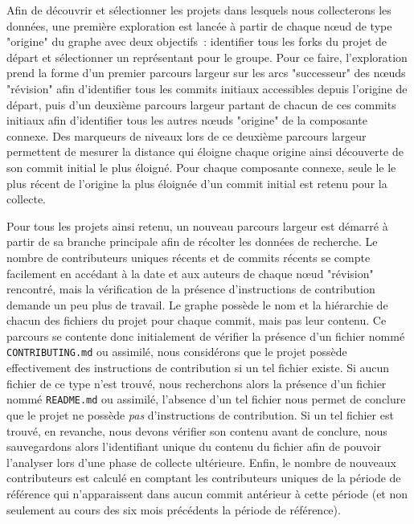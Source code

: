 Afin de découvrir et sélectionner les projets dans lesquels nous collecterons les données, une première
exploration est lancée à partir de chaque nœud de type "origine" du graphe avec deux objectifs : identifier
tous les \glspl{fork} du projet de départ et sélectionner un représentant pour le groupe. Pour ce faire,
l'exploration prend la forme d'un premier parcours largeur sur les arcs "successeur" des nœuds "révision" afin
d'identifier tous les \glspl{commit} initiaux accessibles depuis l'origine de départ, puis d'un deuxième
parcours largeur partant de chacun de ces \glspl{commit} initiaux afin d'identifier tous les autres nœuds
"origine" de la composante connexe. Des marqueurs de niveaux lors de ce deuxième parcours largeur permettent
de mesurer la distance qui éloigne chaque origine ainsi découverte de son \gls{commit} initial le plus
éloigné. Pour chaque composante connexe, seule le  le plus récent de l'origine la plus éloignée
d'un \gls{commit} initial est retenu pour la collecte.

Pour tous les projets ainsi retenu, un nouveau parcours largeur est démarré à partir de sa branche principale
afin de récolter les données de recherche. Le nombre de contributeurs uniques récents et de \glspl{commit}
récents se compte facilement en accédant à la date et aux auteurs de chaque nœud "révision" rencontré, mais la
vérification de la présence d'instructions de contribution demande un peu plus de travail. Le graphe possède
le nom et la hiérarchie de chacun des fichiers du projet pour chaque \gls{commit}, mais pas leur contenu. Ce
parcours se contente donc initialement de vérifier la présence d'un fichier nommé \texttt{CONTRIBUTING.md} ou
assimilé, nous considérons que le projet possède effectivement des instructions de contribution si un tel
fichier existe. Si aucun fichier de ce type n'est trouvé, nous recherchons alors la présence d'un fichier
nommé \texttt{README.md} ou assimilé, l'absence d'un tel fichier nous permet de conclure que le projet ne
possède \emph{pas} d'instructions de contribution. Si un tel fichier est trouvé, en revanche, nous devons
vérifier son contenu avant de conclure, nous sauvegardons alors l'identifiant unique du contenu du fichier
afin de pouvoir l'analyser lors d'une phase de collecte ultérieure. Enfin, le nombre de nouveaux contributeurs
est calculé en comptant les contributeurs uniques de la période de référence qui n'apparaissent dans aucun
\gls{commit} antérieur à cette période (et non seulement au cours des six mois précédents la période de
référence).


